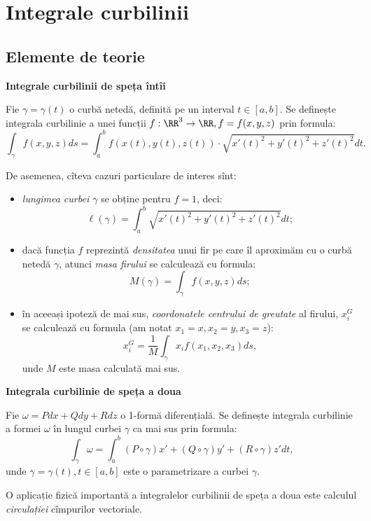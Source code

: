 
\chapter{Integrale curbilinii}

\section{Elemente de teorie}

\textbf{Integrale curbilinii de speța întîi}

Fie $ \gamma = \gamma(t) $ o curbă netedă, definită pe un interval 
$ t \in [a, b] $. Se definește integrala curbilinie a unei
funcții $ f : \RR^3 \to \RR, f = f(x, y, z) $ prin formula:
\[
  \int_\gamma f(x, y, z) ds = \int_a^b f(x(t), y(t), z(t)) \cdot %
  \sqrt{x'(t)^2 + y'(t)^2 + z'(t)^2} dt.
\]

De asemenea, cîteva cazuri particulare de interes sînt:
\begin{itemize}
\item \emph{lungimea curbei $ \gamma $} se obține pentru $ f = 1 $,
  deci:
  \[
    \ell(\gamma) = \int_a^b \sqrt{x'(t)^2 + y'(t)^2 + z'(t)^2} dt;
  \]
\item dacă funcția $ f $ reprezintă \emph{densitatea} unui fir pe care
  îl aproximăm cu o curbă netedă $ \gamma $, atunci \emph{masa firului}
  se calculează cu formula:
  \[
    M(\gamma) = \int_\gamma f(x,y,z) ds;
  \]
\item în aceeași ipoteză de mai sus, \emph{coordonatele centrului de %
    greutate} al firului, $ x_i^G $ se calculează cu formula
  (am notat $ x_1 = x, x_2 = y, x_3 = z $):
  \[
    x_i^G = \dfrac{1}{M} \int_\gamma x_i f(x_1, x_2, x_3) ds,
  \]
  unde $ M $ este masa calculată mai sus.
\end{itemize}

\vspace{0.5cm}

\textbf{Integrala curbilinie de speța a doua}

Fie $ \omega = Pdx + Qdy + Rdz $ o 1-formă diferențială. Se definește
integrala curbilinie a formei $ \omega $ în lungul curbei $ \gamma $ ca mai sus
prin formula:
\[
  \int_\gamma \omega = \int_a^b (P \circ \gamma) x' + (Q \circ \gamma) y' + %
  (R \circ \gamma) z' dt,
\]
unde $ \gamma = \gamma(t), t \in [a, b] $ este o parametrizare a curbei $ \gamma $.

O aplicație fizică importantă a integralelor curbilinii de speța a doua
este calculul \emph{circulației} cîmpurilor vectoriale.

